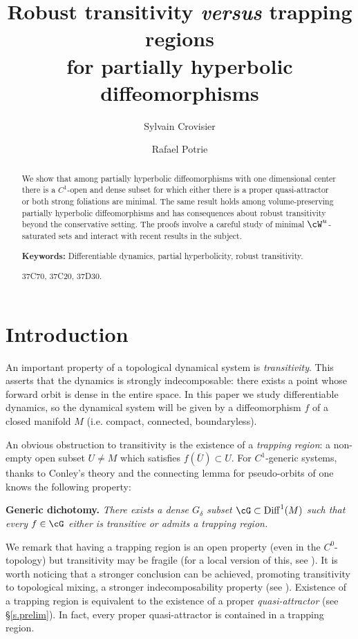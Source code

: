 \documentclass[a4paper,11pt]{amsart}
\author[S. Crovisier]{Sylvain Crovisier}
\author[R. Potrie]{Rafael Potrie}
\title[Robust transitivity versus trapping regions]{Robust transitivity \emph{versus} trapping regions\\ for partially hyperbolic diffeomorphisms}
\numberwithin{equation}{section}     %
\theoremstyle{definition}
\theoremstyle{remark}
\begin{document}
\maketitle

\begin{abstract}
We show that among partially hyperbolic diffeomorphisms with one dimensional center there is a $C^1$-open and dense subset for which either there is a proper quasi-attractor or both strong foliations are minimal. The same result holds among volume-preserving partially hyperbolic diffeomorphisms and has consequences about robust transitivity beyond the conservative setting. The proofs involve a careful study of minimal $\cW^u$-saturated sets and interact with recent results in the subject. 
\bigskip

\noindent
{\bf Keywords:} Differentiable dynamics, partial hyperbolicity, robust transitivity. 
\medskip

 37C70, 37C20, 37D30.   %
\end{abstract}

\section{Introduction}\label{SectionIntroduction}
An important property of a topological dynamical system is \emph{transitivity}. This asserts that the dynamics is strongly indecomposable: there exists a point whose forward orbit is dense in the entire space.
In this paper we study differentiable dynamics, so the dynamical system will be given by a diffeomorphism $f$ of a closed manifold $M$ (i.e. compact, connected, boundaryless).

An obvious obstruction to transitivity is the existence of a \emph{trapping region}: a non-empty open subset $U \neq M$ which satisfies $f(\overline{U}) \subset U$. For $C^1$-generic systems, thanks to Conley's theory and the connecting lemma for pseudo-orbits of \cite{BC-rec} one knows the following property:
\bigskip

\noindent
{\bf Generic dichotomy.} \emph{There exists a dense $G_\delta$ subset $\cG \subset \mathrm{Diff}^1(M)$ such that every $f \in \cG$ either is transitive or admits a trapping region.}
\bigskip

We remark that having a trapping region is an open property (even in the $C^0$-topology) but transitivity may be fragile (for a local version of this, see \cite{BCGP}). It is worth noticing that a stronger conclusion can be achieved, promoting transitivity to topological mixing, a stronger indecomposability property (see \cite{AC}). Existence of a trapping region is equivalent to the existence of a proper \emph{quasi-attractor} (see \S\ref{s.prelim}). In fact, every proper quasi-attractor is contained in a trapping region.
\end{document}
